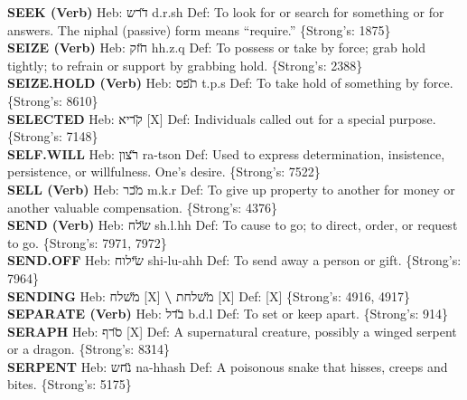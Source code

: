 {\textbf{SEEK (Verb)} Heb: {\large\H דרש} d.r.sh Def: To look for or search for something or for answers. The niphal (passive) form means ``require.'' \{Strong's: 1875\}\hfill{}\\

\textbf{SEIZE (Verb)} Heb: {\large\H חזק} hh.z.q Def: To possess or take by force; grab hold tightly; to refrain or support by grabbing hold. \{Strong's: 2388\}\hfill{}\\

\textbf{SEIZE.HOLD (Verb)} Heb: {\large\H תפס} t.p.s Def: To take hold of something by force. \{Strong's: 8610\}\hfill{}\\

\textbf{SELECTED} Heb: {\large\H קריא} {[}X{]} Def: Individuals called out for a special purpose. \{Strong's: 7148\}\hfill{}\\

\textbf{SELF.WILL} Heb: {\large\H רצון} ra-tson Def: Used to express determination, insistence, persistence, or willfulness. One's desire. \{Strong's: 7522\}\hfill{}\\

\textbf{SELL (Verb)} Heb: {\large\H מכר} m.k.r Def: To give up property to another for money or another valuable compensation. \{Strong's: 4376\}\hfill{}\\

\textbf{SEND (Verb)} Heb: {\large\H שלח} sh.l.hh Def: To cause to go; to direct, order, or request to go. \{Strong's: 7971, 7972\}\hfill{}\\

\textbf{SEND.OFF} Heb: {\large\H שילוח} shi-lu-ahh Def: To send away a person or gift. \{Strong's: 7964\}\hfill{}\\

\textbf{SENDING} Heb: {\large\H משלח} {[}X{]} \textbf{\textbackslash{}} {\large\H משלחת} {[}X{]} Def: {[}X{]} \{Strong's: 4916, 4917\}\hfill{}\\

\textbf{SEPARATE (Verb)} Heb: {\large\H בדל} b.d.l Def: To set or keep apart. \{Strong's: 914\}\hfill{}\\

\textbf{SERAPH} Heb: {\large\H סרף} {[}X{]} Def: A supernatural creature, possibly a winged serpent or a dragon. \{Strong's: 8314\}\hfill{}\\

\textbf{SERPENT} Heb: {\large\H נחש} na-hhash Def: A poisonous snake that hisses, creeps and bites. \{Strong's: 5175\}\hfill{}\\

}
